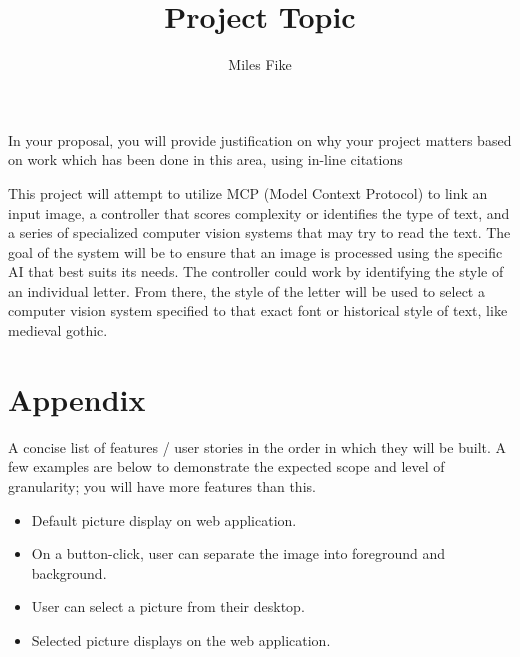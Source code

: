\documentclass[12pt]{article}
\title{\textbf{Project Topic}}
\author{Miles Fike}
\begin{document}
\maketitle

In your proposal, you will provide justification on why your project matters based on work which has been done in this area, using in-line citations

This project will attempt to utilize MCP (Model Context Protocol) to link an input image, a controller that scores complexity or identifies the type of text, and a series of specialized computer vision systems that may try to read the text. The goal of the system will be to ensure that an image is processed using the specific AI that best suits its needs. The controller could work by identifying the style of an individual letter. From there, the style of the letter will be used to select a computer vision system specified to that exact font or historical style of text, like medieval gothic. 
\newpage
\section*{Appendix}
A concise list of features / user stories in the order in which they will be built. A few examples are below to demonstrate the expected scope and level of granularity; you will have more features than this.
\begin{itemize}
	\item Default picture display on web application.
	\item On a button-click, user can separate the image into foreground and background.
	\item User can select a picture from their desktop.
	\item Selected picture displays on the web application.
\end{itemize}




\end{document}
